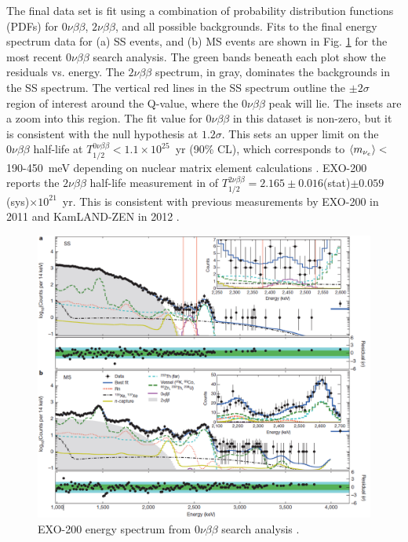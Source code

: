 The final data set is fit using a combination of probability distribution functions (PDFs) for $0\nu\beta\beta$, $2\nu\beta\beta$, and all possible backgrounds.  Fits to the final energy spectrum data for (a) SS events, and (b) MS events are shown in Fig. \ref{fig:exo200data} for the most recent $0\nu\beta\beta$ search analysis.  The green bands beneath each plot show the residuals vs. energy.  The $2\nu\beta\beta$ spectrum, in gray, dominates the backgrounds in the SS spectrum.  The vertical red lines in the SS spectrum outline the $\pm 2 \sigma$ region of interest around the Q-value, where the $0\nu\beta\beta$ peak will lie.  The insets are a zoom into this region.  The fit value for $0\nu\beta\beta$ in this dataset is non-zero, but it is consistent with the null hypothesis at $1.2 \sigma$.  This sets an upper limit on the $0\nu\beta\beta$ half-life at $T^{0\nu\beta\beta}_{1/2} < 1.1 \times 10^{25}$~yr (90\% CL), which corresponds to $\braket{m_{\nu_{e}}} < $190-450~meV depending on nuclear matrix element calculations \cite{EXO2000nuNature}.  EXO-200 reports the $2\nu\beta\beta$ half-life measurement in \cite{EXO200TwoNuLong} of $T^{2\nu\beta\beta}_{1/2} = 2.165 \pm 0.016$(stat)$ \pm 0.059$(sys)$ \times 10^{21}$~yr.  This is consistent with previous measurements by EXO-200 in 2011 \cite{EXO200TwoNuOriginal} and KamLAND-ZEN in 2012 \cite{KamLAND}.

\begin{figure} %
	\centering
	\includegraphics[width=.95\textwidth]{figures/0nu_spectrum_nature.png}
	\caption{EXO-200 energy spectrum from $0\nu\beta\beta$ search analysis \cite{EXO2000nuNature}.}
\label{fig:exo200data}
\end{figure}

